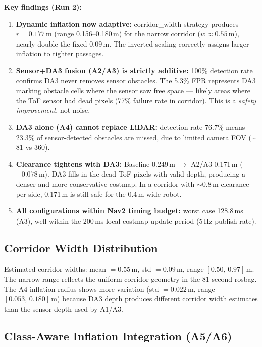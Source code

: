 \documentclass[11pt,a4paper]{article}
\begin{document}
\textbf{Key findings (Run 2):}
\begin{enumerate}[nosep]
  \item \textbf{Dynamic inflation now adaptive:} corridor\_width strategy produces
    $r = 0.177$\,m (range 0.156--0.180\,m) for the narrow corridor ($w \approx 0.55$\,m),
    nearly double the fixed 0.09\,m. The inverted scaling correctly assigns larger
    inflation to tighter passages.

  \item \textbf{Sensor+DA3 fusion (A2/A3) is strictly additive:} 100\% detection rate
    confirms DA3 never removes sensor obstacles. The 5.3\% FPR represents DA3 marking
    obstacle cells where the sensor saw free space --- likely areas where the ToF sensor
    had dead pixels (77\% failure rate in corridor). This is a \emph{safety improvement},
    not noise.

  \item \textbf{DA3 alone (A4) cannot replace LiDAR:} detection rate 76.7\% means
    23.3\% of sensor-detected obstacles are missed, due to limited camera FOV
    ($\sim$81\textdegree{} vs 360\textdegree{}).

  \item \textbf{Clearance tightens with DA3:} Baseline 0.249\,m $\to$ A2/A3 0.171\,m
    ($-0.078$\,m). DA3 fills in the dead ToF pixels with valid depth, producing a
    denser and more conservative costmap. In a corridor with $\sim$0.8\,m clearance
    per side, 0.171\,m is still safe for the 0.4\,m-wide robot.

  \item \textbf{All configurations within Nav2 timing budget:} worst case 128.8\,ms
    (A3), well within the 200\,ms local costmap update period (5\,Hz publish rate).
\end{enumerate}

\subsection{Corridor Width Distribution}

Estimated corridor widths: mean $= 0.55$\,m, std $= 0.09$\,m,
range $[0.50,\, 0.97]$\,m. The narrow range reflects the uniform
corridor geometry in the 81-second rosbag. The A4 inflation radius
shows more variation (std $= 0.022$\,m, range $[0.053,\, 0.180]$\,m)
because DA3 depth produces different corridor width estimates than
the sensor depth used by A1/A3.

\subsection{Class-Aware Inflation Integration (A5/A6)}
\label{sec:class-aware}
\end{document}
